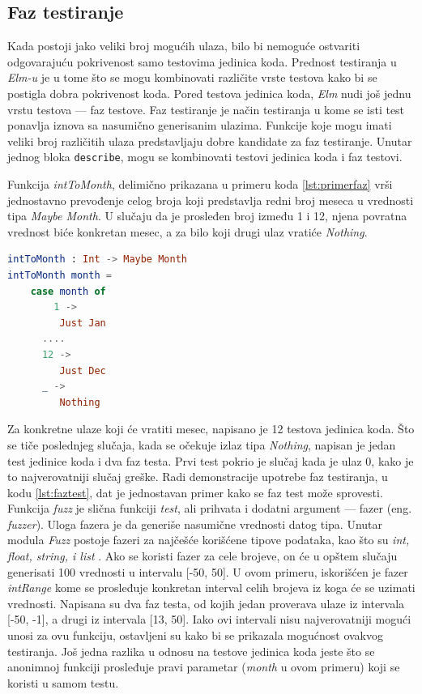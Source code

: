 \documentclass[12pt,oneside]{memoir}
\begin{document}
\subsection{Faz testiranje}
\par Kada postoji jako veliki broj mogućih ulaza, bilo bi nemoguće ostvariti odgovarajuću pokrivenost samo testovima jedinica koda. Prednost testiranja u \emph{Elm-u} je u tome što se mogu kombinovati različite vrste testova kako bi se postigla dobra pokrivenost koda. Pored testova jedinica koda, \emph{Elm} nudi još jednu vrstu testova --- faz testove. Faz testiranje je način testiranja u kome se isti test ponavlja iznova sa nasumično generisanim ulazima. Funkcije koje mogu imati veliki broj različitih ulaza predstavljaju dobre kandidate za faz testiranje. Unutar jednog bloka \texttt{describe}, mogu se kombinovati testovi jedinica koda i faz testovi.
\par Funkcija \emph{intToMonth}, delimično prikazana u primeru koda \ref{lst:primerfaz} vrši jednostavno prevođenje celog broja koji predstavlja redni broj meseca u vrednosti tipa \emph{Maybe Month}. U slučaju da je prosleđen broj između 1 i 12, njena povratna vrednost biće konkretan mesec, a za bilo koji drugi ulaz vratiće \emph{Nothing}.

\begin{minipage}{\linewidth}
\begin{lstlisting}[language=elm, basicstyle=\small, caption={Implementacija funkcije \emph{intToMonth}},captionpos=b, label={lst:primerfaz}]
intToMonth : Int -> Maybe Month
intToMonth month =
    case month of
     	1 -> 
         Just Jan
      ....
      12 ->
         Just Dec
      _ ->
         Nothing
\end{lstlisting}
\end{minipage}

\par Za konkretne ulaze koji će vratiti mesec, napisano je 12 testova jedinica koda. Što se tiče poslednjeg slučaja, kada se očekuje izlaz tipa \emph{Nothing}, napisan je jedan test jedinice koda i dva faz testa. Prvi test pokrio je slučaj kada je ulaz 0, kako je to najverovatniji slučaj greške. Radi demonstracije upotrebe faz testiranja, u kodu \ref{lst:faztest}, dat je jednostavan primer kako se faz test može sprovesti. Funkcija \emph{fuzz} je slična funkciji \emph{test}, ali prihvata i dodatni argument --- fazer (eng. \emph{fuzzer}). Uloga fazera je da generiše nasumične vrednosti datog tipa. Unutar modula \emph{Fuzz} postoje fazeri za najčešće korišćene tipove podataka, kao što su \emph{int, float, string, i list} \cite{fuzz}. Ako se koristi fazer za cele brojeve, on će u opštem slučaju generisati 100 vrednosti u intervalu [-50, 50]. U ovom primeru, iskorišćen je fazer \emph{intRange} kome se prosleđuje konkretan interval celih brojeva iz koga će se uzimati vrednosti. Napisana su dva faz testa, od kojih jedan proverava ulaze iz intervala [-50, -1], a drugi iz intervala [13, 50]. Iako ovi intervali nisu najverovatniji mogući unosi za ovu funkciju, ostavljeni su kako bi se prikazala mogućnost ovakvog testiranja. Još jedna razlika u odnosu na testove jedinica koda jeste što se anonimnoj funkciji prosleđuje pravi parametar (\emph{month} u ovom primeru) koji se koristi u samom testu. 
\end{document}
